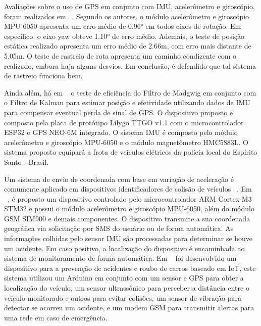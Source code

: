 Avaliações sobre o uso de GPS em conjunto com IMU, acelerômetro e giroscópio, foram realizados em ~\cite{Listiyana2018}. Segundo os autores, o módulo acelerômetro e giroscópio MPU-6050 apresenta um erro médio de 0.96° em todos eixos de rotação. Em específico, o eixo yaw obteve 1.10° de erro médio. Ademais, o teste de posição estática realizado apresenta um erro médio de 2.66m, com erro mais distante de 5.05m. O teste de rastreio de rota apresenta um caminho condizente com o realizado, embora haja alguns desvios. Em conclusão, é defendido que tal sistema de rastreio funciona bem. %

Ainda além, há em ~\cite{Lopes2023} o teste de eficiência do Filtro de Madgwig em conjunto com o Filtro de Kalman para estimar posição e efetividade utilizando dados de IMU para compensar eventual perda de sinal de GPS. O dispositivo proposto é composto pela placa de protótipo Lilygo TTGO v1.1 com o microcontrolador ESP32 e GPS NEO-6M integrado. O sistema IMU é composto pelo módulo acelerômetro e giroscópio MPU-6050 e o módulo magnetômetro HMC5883L. O sistema proposto equipará a frota de veículos elétricos da polícia local do Espírito Santo - Brasil.

Um sistema de envio de coordenada com base em variação de aceleração é comumente aplicado em dispositivos identificadores de colisão de veículos ~\cite{Abdeen2016, Cismas2017, Azlan2023, Karuna2023}. Em ~\cite{Abdeen2016}, é proposto um dispositivo controlado pelo microcontrolador ARM Cortex-M3 STM32 e possui o módulo acelerômetro e giroscópio MPU-6050, além do módulo GSM SIM900 e demais componentes. O dispositivo transmite a sua coordenada geográfica via solicitação por SMS do usuário ou de forma automática. As informações colhidas pelo sensor IMU são processadas para determinar se houve um acidente. Em caso positivo, a localização do dispositivo é encaminhada ao sistema de monitoramento de forma automática. Em ~\cite{agarwal2020} foi desenvolvido um dispositivo para a prevenção de acidentes e roubo de carros baseado em IoT, este sistema utilizou um Arduino em conjunto com um sensor e GPS para obter a localização do veículo, um sensor ultrassônico para perceber a distância entre o veículo monitorado e outros para evitar colisões, um sensor de vibração para detectar se ocorreu um acidente, e um modem GSM para transmitir alertas para uma rede em caso de emergência.

